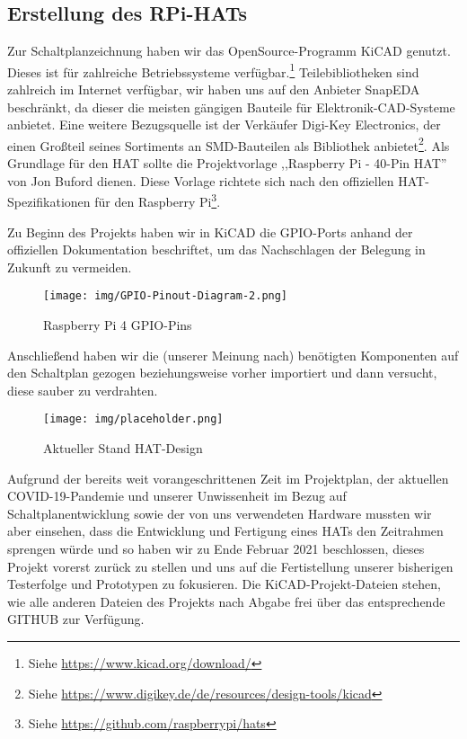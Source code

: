 \subsection{Erstellung des RPi-HATs}\label{hw_hat}
Zur Schaltplanzeichnung haben wir das OpenSource-Programm KiCAD genutzt. Dieses ist für zahlreiche Betriebssysteme verfügbar.\footnote{Siehe \url{https://www.kicad.org/download/}} Teilebibliotheken sind zahlreich im Internet verfügbar, wir haben uns auf den Anbieter SnapEDA beschränkt, da dieser die meisten gängigen Bauteile für Elektronik-CAD-Systeme anbietet. Eine weitere Bezugsquelle ist der Verkäufer Digi-Key Electronics, der einen Großteil seines Sortiments an SMD-Bauteilen als Bibliothek anbietet\footnote{Siehe \url{https://www.digikey.de/de/resources/design-tools/kicad}}. Als Grundlage für den HAT sollte die Projektvorlage ,,Raspberry Pi - 40-Pin HAT'' von Jon Buford dienen. Diese Vorlage richtete sich nach den offiziellen HAT-Spezifikationen für den Raspberry Pi\footnote{Siehe \url{https://github.com/raspberrypi/hats}}.\par
Zu Beginn des Projekts haben wir in KiCAD die GPIO-Ports anhand der offiziellen Dokumentation beschriftet, um das Nachschlagen der Belegung in Zukunft zu vermeiden.
\begin{figure}[h!tb]
	\texttt{[image: img/GPIO-Pinout-Diagram-2.png]}
	\caption[Raspberry Pi 4 GPIO-Pins]{Raspberry Pi 4 GPIO-Pins}
	\label{rpi-gpio-pins}
\end{figure}
\par
Anschließend haben wir die (unserer Meinung nach) benötigten Komponenten auf den Schaltplan gezogen beziehungsweise vorher importiert und dann versucht, diese sauber zu verdrahten.\par
\begin{figure}[h!tb]
	\texttt{[image: img/placeholder.png]}
	\caption[Aktueller Stand HAT-Design]{Aktueller Stand HAT-Design}
	\label{hat-design}
\end{figure}
Aufgrund der bereits weit vorangeschrittenen Zeit im Projektplan, der aktuellen COVID-19-Pandemie und unserer Unwissenheit im Bezug auf Schaltplanentwicklung sowie der von uns verwendeten Hardware mussten wir aber einsehen, dass die Entwicklung und Fertigung eines HATs den Zeitrahmen sprengen würde und so haben wir zu Ende Februar 2021 beschlossen, dieses Projekt vorerst zurück zu stellen und uns auf die Fertistellung unserer bisherigen Testerfolge und Prototypen zu fokusieren. Die KiCAD-Projekt-Dateien stehen, wie alle anderen Dateien des Projekts nach Abgabe frei über das entsprechende GITHUB zur Verfügung.\par